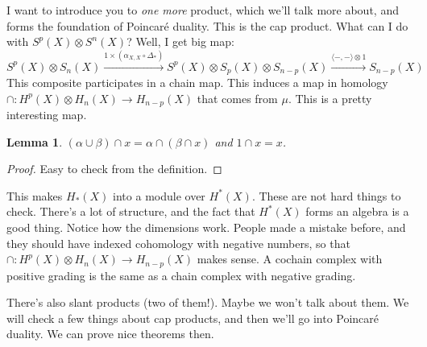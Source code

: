 \documentclass{amsart}
\theoremstyle{theorem}
\newtheorem{lemma}[theorem]{Lemma}
\theoremstyle{definition}
\begin{document}
I want to introduce you to \emph{one more} product, which we'll talk more about, and forms the foundation of Poincar\'{e} duality. This is the cap product. What can I do with $S^p(X)\otimes S^n(X)$? Well, I get big map:
\begin{equation*}
S^p(X)\otimes S_n(X)\xrightarrow{1\times (\alpha_{X,X}\circ \Delta_\ast)} S^p(X)\otimes S_p(X)\otimes S_{n-p}(X)\xrightarrow{\langle -,-\rangle\otimes 1}S_{n-p}(X)
\end{equation*}
This composite participates in a chain map. This induces a map in homology $\cap: H^p(X)\otimes H_n(X)\to H_{n-p}(X)$ that comes from $\mu$. This is a pretty interesting map.
\begin{lemma}
$(\alpha\cup\beta)\cap x=\alpha\cap(\beta\cap x)$ and $1\cap x=x$.
\end{lemma}
\begin{proof}
Easy to check from the definition.
\end{proof}
This makes $ H_\ast(X)$ into a module over $ H^\ast(X)$. These are not hard things to check. There's a lot of structure, and the fact that $ H^\ast(X)$ forms an algebra is a good thing. Notice how the dimensions work. People made a mistake before, and they should have indexed cohomology with negative numbers, so that $\cap: H^p(X)\otimes H_n(X)\to H_{n-p}(X)$ makes sense. A cochain complex with positive grading is the same as a chain complex with negative grading.

There's also slant products (two of them!). Maybe we won't talk about them. We will check a few things about cap products, and then we'll go into Poincar\'{e} duality. We can prove nice theorems then.
\end{document}
